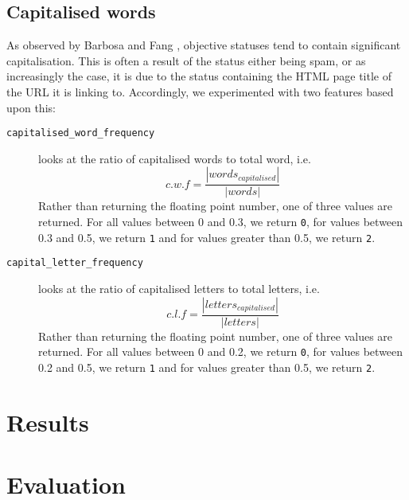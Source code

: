 \subsection{Capitalised words}

As observed by Barbosa and Fang \cite{Barbosa:ws}, objective statuses tend to contain significant capitalisation. This is often a result of the status either being spam, or as increasingly the case, it is due to the status containing the HTML page title of the URL it is linking to. Accordingly, we experimented with two features based upon this:

\begin{description}
	\item [\texttt{capitalised\_word\_frequency}] {looks at the ratio of capitalised words to total word, i.e.
	\begin{equation}
		c.w.f = \frac{|words_{capitalised}|}{|words|}
	\end{equation}
	Rather than returning the floating point number, one of three values are returned. For all values between 0 and 0.3, we return \texttt{0}, for values between 0.3 and 0.5, we return \texttt{1} and for values greater than 0.5, we return \texttt{2}.
	}
	\item [\texttt{capital\_letter\_frequency}] looks at the ratio of capitalised letters to total letters, i.e.
	\begin{equation}
		c.l.f = \frac{|letters_{capitalised}|}{|letters|}
	\end{equation}
	Rather than returning the floating point number, one of three values are returned. For all values between 0 and 0.2, we return \texttt{0}, for values between 0.2 and 0.5, we return \texttt{1} and for values greater than 0.5, we return \texttt{2}.
\end{description}

\section{Results}

\section{Evaluation}






